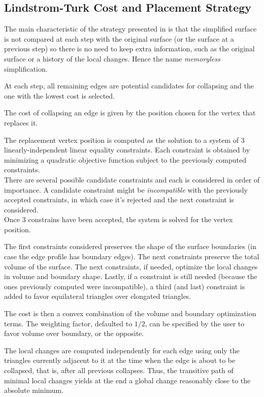 \begin{ccAdvanced}
\subsection{Lindstrom-Turk Cost and Placement Strategy\label{SurfaceMeshSimplification:LindstromTurkStrategy}}

The main characteristic of the strategy presented in
\cite{cgal:lt-fmeps-98,cgal:lt-ems-99} is that the simplified surface
is not compared at each step with the original surface (or the surface
at a previous step) so there is no need to keep extra information,
such as the original surface or a history of the local changes. Hence
the name {\em memoryless} simplification.

At each step, all remaining edges are potential candidates for 
collapsing and the one with the lowest cost is selected.

The cost of collapsing an edge is given by the position chosen for the
vertex that replaces it. 

The replacement vertex position is computed as
the solution to a system of 3 linearly-independent linear equality constraints.
Each constraint is obtained by minimizing a quadratic objective function
subject to the previously computed constraints.\\
There are several possible candidate constraints and each is considered in order of importance.
A candidate constraint might be {\em incompatible} with the previously accepted constraints,
in which case it's rejected and the next constraint is considered.\\
Once 3 constrains have been accepted, the system is solved for the vertex position.

The first constraints considered preserves the shape of the surface boundaries 
(in case the edge profile has boundary edges).
The next constraints preserve the total volume of the surface.
The next constraints, if needed, optimize the local changes in volume and boundary shape.
Lastly, if a constraint is still needed (because the ones previously computed were incompatible),
a third (and last) constraint is added to favor equilateral triangles over elongated triangles.

The cost is then a convex combination of the volume and boundary optimization terms.
The weighting factor, defaulted to $1/2$, can be specified by the user to favor volume over
boundary, or the opposite.

The local changes are computed independently for each edge using only
the triangles currently adjacent to it at the time when the edge 
is about to be collapsed, that is, after all previous collapses.
Thus, the transitive path of minimal local changes yields at
the end a global change reasonably close to the absolute minimum.
\end{ccAdvanced}

